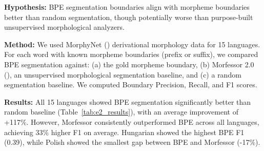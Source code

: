 \documentclass[11pt]{article}
\begin{document}
\textbf{Hypothesis:} BPE segmentation boundaries align with morpheme boundaries better than random segmentation, though potentially worse than purpose-built unsupervised morphological analyzers.

\textbf{Method:} We used MorphyNet (\citealt{batsuren-etal-2021-morphynet}) derivational morphology data for 15 languages. For each word with known morpheme boundaries (prefix or suffix), we compared BPE segmentation against: (a) the gold morpheme boundary, (b) Morfessor 2.0 (\citealt{virpioja2013morfessor}), an unsupervised morphological segmentation baseline, and (c) a random segmentation baseline. We computed Boundary Precision, Recall, and F1 scores.

\textbf{Results:} All 15 languages showed BPE segmentation significantly better than random baseline (Table~\ref{tab:e2_results}), with an average improvement of +117\%. However, Morfessor consistently outperformed BPE across all languages, achieving 33\% higher F1 on average. Hungarian showed the highest BPE F1 (0.39), while Polish showed the smallest gap between BPE and Morfessor (-17\%).
\end{document}
